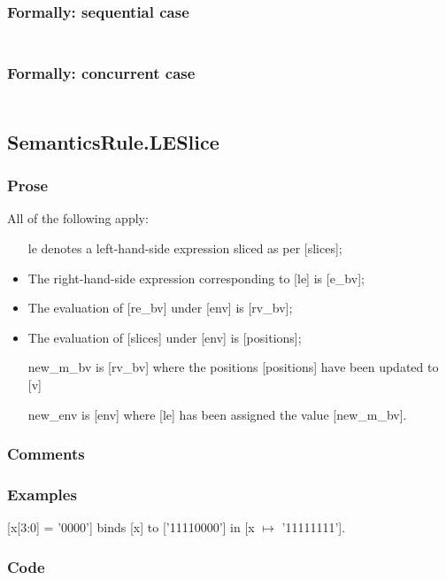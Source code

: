 \documentclass{book}
\begin{document}
  \subsubsection{Formally: sequential case}
  \begin{align}
  \end{align} 

  \subsubsection{Formally: concurrent case}
  \begin{align}
  \end{align} 

\subsection{SemanticsRule.LESlice \label{sec:SemanticsRule.LESlice}}

    \subsubsection{Prose}
    All of the following apply:
    \begin{itemize}
    \item [le] denotes a left-hand-side expression sliced as per [slices];
    \item The right-hand-side expression corresponding to [le] is [e\_bv];
    \item The evaluation of [re\_bv] under [env] is [rv\_bv];
    \item The evaluation of [slices] under [env] is [positions];
    \item [new\_m\_bv] is [rv\_bv] where the positions [positions] have been updated to [v]
    \item [new\_env] is [env] where [le] has been assigned the value [new\_m\_bv].
    \end{itemize}

   \subsubsection{Comments}

   \subsubsection{Examples}
   [x[3:0] = '0000'] binds [x] to ['11110000'] in [x $\mapsto$ '11111111'].

  \subsubsection{Code}
\end{document}
